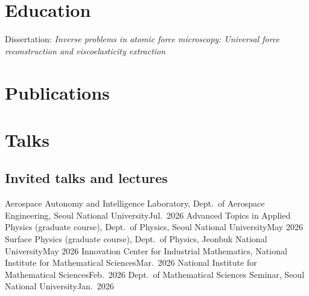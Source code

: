 \section{Education}
\begin{notes}
  \item Dissertation: \textit{Inverse problems in atomic force microscopy: Universal force reconstruction and viscoelasticity extraction}
\end{notes}

\section{Publications}


\section{Talks}
\subsection{Invited talks and lectures}
\begin{talks}
       {Aerospace Autonomy and Intelligence Laboratory, Dept.\ of Aerospace Engineering, Seoul National University}{Jul.\ 2026}
       {Advanced Topics in Applied Physics (graduate course), Dept.\ of Physics, Seoul National University}{May 2026}
       {Surface Physics (graduate course), Dept.\ of Physics, Jeonbuk National University}{May 2026}
       {Innovation Center for Industrial Mathematics, National Institute for Mathematical Sciences}{Mar.\ 2026}
       {National Institute for Mathematical Sciences}{Feb.\ 2026}
       {Dept.\ of Mathematical Sciences Seminar, Seoul National University}{Jan.\ 2026}
\end{talks}

